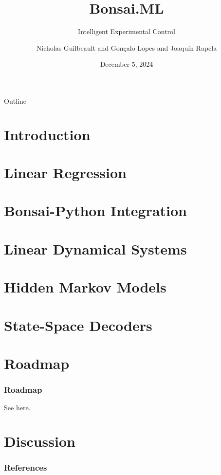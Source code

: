 \documentclass{beamer}
\title{Bonsai.ML}
\subtitle{Intelligent Experimental Control}
\author{Nicholas Guilbeault and Gon\c{c}alo Lopes and Joaqu\'{i}n Rapela}
\institute{Gatsby Computational Neuroscience Unit\\NeuroGEARS Ltd.}
\date{December 5, 2024}
\begin{document}
\begin{frame}
	\titlepage
\end{frame}

\begin{frame}{Outline}
    \tableofcontents
\end{frame}

\section{Introduction}



\section{Linear Regression}



\section{Bonsai-Python Integration}

\section{Linear Dynamical Systems}

\section{Hidden Markov Models}

\section{State-Space Decoders}

\section{Roadmap}

\begin{frame}
    \frametitle{Roadmap}

    See \href{https://github.com/joacorapela/bonsaiML/projects?query=is\%3Aopen}{here}.

\end{frame}

\section{Discussion}



\begin{frame}
    \frametitle{References}

    \tiny{
        
        
    }

\end{frame}
\end{document}
